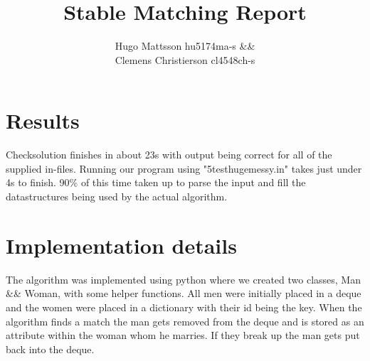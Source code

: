 \usepackage{booktabs}
\usepackage{microtype}
\usepackage[colorinlistoftodos]{todonotes}
\pagestyle{empty}

\title{Stable Matching Report}
\author{Hugo Mattsson hu5174ma-s \&\& \\ Clemens Christierson cl4548ch-s}


  \maketitle

  \section{Results}

  
  Checksolution finishes in about 23s with output being correct for all of the supplied in-files. Running our program using "5testhugemessy.in" takes just under 4s to finish. 90\% of this time taken up to parse the input and fill the datastructures being used by the actual algorithm.

  \section{Implementation details}

  
  The algorithm was implemented using python where we created two classes, Man \&\& Woman, with some helper functions. All men were initially placed in a deque and the women were placed in a dictionary with their id being the key. 
  When the algorithm finds a match the man gets removed from the deque and is stored as an attribute within the woman whom he marries. If they break up the man gets put back into the deque. 

